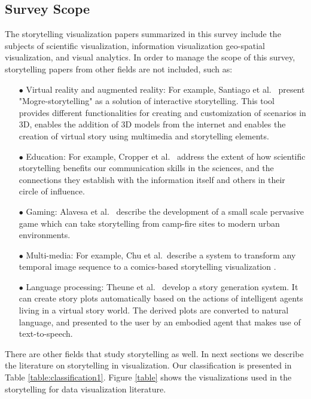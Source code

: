 \documentclass{egpubl}
\begin{document}
\subsection{Survey Scope}
The storytelling visualization papers summarized in this survey include the subjects of scientific visualization, information visualization geo-spatial visualization, and visual analytics. In order to manage the scope of this survey, storytelling papers from other fields are not included, such as:
\begin{enumerate}
	\item[$\bullet$] Virtual reality and augmented reality: For example, Santiago et al.\ \cite{santiago2014mogre} present "Mogre-storytelling" as a solution of interactive storytelling. This tool provides different functionalities for creating and customization of scenarios in 3D, enables the addition of 3D models from the internet and enables the creation of virtual story using multimedia and storytelling elements.
	\item[$\bullet$] Education:  For example, Cropper et al.\ \cite{cropper2015scientific} address the extent of how scientific storytelling benefits our communication skills in the sciences, and the connections they establish with the information itself and others in their circle of influence.
	\item[$\bullet$] Gaming: Alavesa et al.\ \cite{alavesa2013combining} describe the development of a small scale pervasive game which can take storytelling from camp-fire sites to modern urban environments. 
	\item[$\bullet$] Multi-media: For example, Chu et al.\ describe a system to transform any temporal image sequence to a comics-based storytelling visualization \cite{chu2015}. 
	\item[$\bullet$] Language processing: Theune et al.\ \cite{theune2006generating} develop a story generation system. It can create story plots automatically based on the actions of intelligent agents living in a virtual story world. The derived plots are converted to natural language, and presented to the user by an embodied agent that makes use of text-to-speech.
\end{enumerate}
There are other fields that study storytelling as well. In next sections we describe the literature on storytelling in visualization. Our classification is presented in Table \ref{table:classification1}. Figure \ref{table} shows the visualizations used in the storytelling for data visualization literature.
\end{document}
